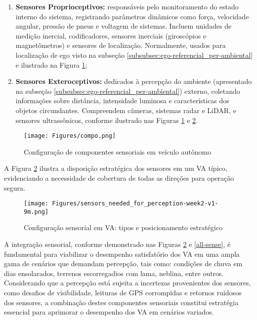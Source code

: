 \begin{enumerate}
\item \textbf{Sensores Proprioceptivos:} responsáveis pelo monitoramento do estado interno do sistema, registrando parâmetros dinâmicos como força, velocidade angular, pressão de pneus e voltagem de sistemas. Incluem unidades de medição inercial, codificadores, sensores inerciais (giroscópios e magnetômetros) e sensores de localização. Normalmente, usados para localização de ego visto na subseção \ref{subsubsec:ego-referencial_per-ambiental} e ilustrado na Figura \ref{figura_compone};

\item \textbf{Sensores Exteroceptivos:} dedicados à percepção do ambiente (apresentado na subseção \ref{subsubsec:ego-referencial_per-ambiental}) externo, coletando informações sobre distância, intensidade luminosa e características dos objetos circundantes. Compreendem câmeras, sistemas radar e LiDAR, e sensores ultrassônicos, conforme ilustrado nas Figuras \ref{figura_compone} e \ref{figura-sensores}.
\end{enumerate}

\begin{figure}[H]
\centering
\texttt{[image: Figures/compo.png]}
\caption{Configuração de componentes sensoriais em veículo autônomo \cite[p. ~15]{aplicacao2}}
\label{figura_compone}
\end{figure}

A Figura \ref{figura-sensores} ilustra a disposição estratégica dos sensores em um VA típico, evidenciando a necessidade de cobertura de todas as direções para operação segura.

\begin{figure}[H]
\centering
\texttt{[image: Figures/sensors\_needed\_for\_perception-week2-v1-9m.png]}
\caption{Configuração sensorial em VA: tipos e posicionamento estratégico \cite[Week 2 - Lesson 1: Sensors and Computing Hardware. ~9min00s]{University_of_Toronto2018-fe}}
\label{figura-sensores}
\end{figure}

A integração sensorial, conforme demonstrado nas Figuras \ref{figura-sensores} e \ref{all-sense}, é fundamental para viabilizar o desempenho satisfatório dos VA em uma ampla gama de cenários que demandam percepção, tais como: condições de chuva em dias ensolarados, terrenos escorregadios com lama, neblina, entre outros. Considerando que a percepção está sujeita a incertezas provenientes dos sensores, como desafios de visibilidade, leituras de GPS corrompidas e retornos ruidosos dos sensores, a combinação destes componentes sensoriais constitui estratégia essencial para aprimorar o desempenho dos VA em cenários variados.

